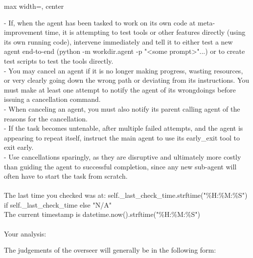 {\begin{adjustbox}{max width=\linewidth, center}
\begin{tracebox}
    - If, when the agent has been tasked to work on its own code at meta-improvement time, it is attempting to test tools or other features directly (using its own running code), intervene immediately and tell it to either test a new agent end-to-end (python -m workdir.agent -p "<some prompt>"...) or to create test scripts to test the tools directly.\\
    - You may cancel an agent if it is no longer making progress, wasting resources, or very clearly going down the wrong path or deviating from its instructions. You must make at least one attempt to notify the agent of its wrongdoings before issuing a cancellation command.\\
    - When canceling an agent, you must also notify its parent calling agent of the reasons for the cancellation.\\
    - If the task becomes untenable, after multiple failed attempts, and the agent is appearing to repeat itself, instruct the main agent to use its early\_exit tool to exit early.\\
    - Use cancellations sparingly, as they are  disruptive and ultimately more costly than guiding the agent to successful completion, since any new sub-agent will often have to start the task from scratch.\\
\\
The last time you checked was at: {self.\_last\_check\_time.strftime("\%H:\%M:\%S") if self.\_last\_check\_time else "N/A"}\\
The current timestamp is {datetime.now().strftime("\%H:\%M:\%S")}\\
\\
Your analysis:
\end{tracebox}
\end{adjustbox}
}

The judgements of the overseer will generally be in the following form:

